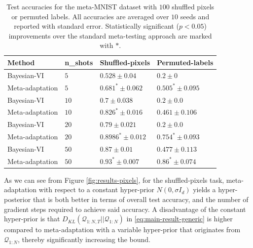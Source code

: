 \documentclass{article} %
\theoremstyle{definition}
\begin{document}
\begin{table}[t]	
	
	\centering
	\begin{tabular}{llll}
		\toprule
		Method   & n\_shots  & Shuffled-pixels & Permuted-labels  \\
		\midrule
		Bayesian-VI  & $5$   & $0.528\pm 0.04 $   & $0.2\pm 0 $   \\
		Meta-adaptation & $5$   & $0.681^*\pm 0.062 $ & $0.505^*\pm 0.095 $ \\
		\midrule
		Bayesian-VI  & $10$   & $0.7\pm 0.038 $   & $0.2\pm 0.0 $   \\
		Meta-adaptation & $10$   & $0.826^*\pm 0.016 $ & $0.461\pm 0.106 $ \\
		\midrule
		Bayesian-VI  & $20$   & $0.79\pm 0.021 $   & $0.2\pm 0.0 $   \\
		Meta-adaptation & $20$   & $0.8986^*\pm 0.012 $ & $0.754^*\pm 0.093 $ \\
		\midrule
		Bayesian-VI  & $50$   & $0.87\pm 0.01 $   & $0.477\pm 0.113 $   \\
		Meta-adaptation & $50$   & $0.93^*\pm 0.007 $ & $0.86^*\pm 0.074 $ \\
		\midrule
		\bottomrule
	\end{tabular}
	\caption{Test accuracies for the meta-MNIST dataset with $100$ shuffled pixels or permuted labels. All accuracies are averaged over $10$ seeds and reported with standard error. Statistically significant ($p<0.05$) improvements over the standard meta-testing approach are marked with $*$.}
	\label{table:gamma}
\end{table}

As we can see from Figure \ref{fig:results-pixels}, for the shuffled-pixels task, meta-adaptation with respect to a constant hyper-prior $N(0,\sigma I_d)$ yields a hyper-posterior that is both better in terms of overall test accuracy, and the number of gradient steps required to achieve said accuracy. A disadvantage of the constant hyper-prior is that $D_{KL}(\mathcal{Q}_{1:N,T}||\mathcal{Q}_{1:N})$ in \eqref{eq:main-result-generic} is higher compared to meta-adaptation with a variable hyper-prior that originates from $\mathcal{Q}_{1:N}$, thereby significantly increasing the bound.
\end{document}
